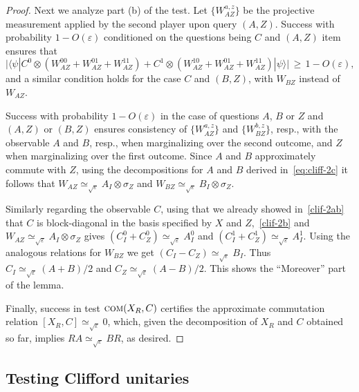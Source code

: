 \documentclass[11pt]{article}
\numberwithin{equation}{section}
\theoremstyle{definition}
\theoremstyle{plain}
\newcommand{\ket}[1]{|#1\rangle}
\newcommand{\bra}[1]{\langle#1|}
\newcommand{\eps}{\varepsilon}
\newcommand{\comt}{\textsc{com}}
\begin{document}
\begin{proof}
Next we analyze part (b) of the test. Let $\{W_{AZ}^{a,z}\}$ be the projective measurement applied by the second player upon query $(A,Z)$. Success with probability $1-O(\eps)$ conditioned on the questions being $C$ and $(A,Z)$ item ensures that 
\begin{equation}\label{clif-2b}
\big| \bra{\psi} C^0 \otimes (W_{AZ}^{00} + W_{AZ}^{01} + W_{AZ}^{11}) + C^1\otimes (W_{AZ}^{10} + W_{AZ}^{01} + W_{AZ}^{11}) \ket{\psi} \big| \,\geq\,1-O(\eps),
\end{equation}
and a similar condition holds for the case $C$ and $(B,Z)$, with $W_{BZ}$ instead of $W_{AZ}$. 

Success with probability $1-O(\eps)$ in the case of questions $A$, $B$ or $Z$ and $(A,Z)$ or $(B,Z)$ %
ensures consistency of $\{W_{AZ}^{a,z}\}$
%
and $\{W_{BZ}^{b,z}\}$, resp., %
with the observable $A$ %
and $B$, resp., 
when marginalizing over the second outcome, 
and $Z$ when marginalizing over the first outcome.  Since
%
%
$A$ and $B$   %
approximately commute
with $Z$,  %
using the decompositions for $A$ and $B$ derived in~\eqref{eq:cliff-2c} it follows that $W_{AZ} \simeq_{\sqrt{\eps}} A_I \otimes \sigma_Z$ and $W_{BZ} \simeq_{\sqrt{\eps}} B_I \otimes \sigma_Z$. 

Similarly regarding the observable $C$, using that we already showed in~\eqref{clif-2ab} that $C$ is block-diagonal in the basis specified by $X$ and $Z$,~\eqref{clif-2b} and $W_{AZ} \simeq_{\sqrt{\eps}} A_I \otimes \sigma_Z$ gives $(C_I^0 + C_Z^0) \simeq_{\sqrt{\eps}} A_I^0$ and $(C_I^1 + C_Z^1) \simeq_{\sqrt{\eps}} A_I^1$. Using the analogous relations for $W_{BZ}$ we get $(C_I - C_Z) \simeq_{\sqrt{\eps}} B_I$. Thus $C_I \simeq_{\sqrt{\eps}} (A+B)/2$ and $C_Z \simeq_{\sqrt{\eps}} (A-B)/2$. This shows the ``Moreover'' part of the lemma. 

Finally, success in test $\comt(X_R,C)$ certifies the approximate commutation relation $[X_R,C]\simeq_{\sqrt{\eps}} 0$, which, given the decomposition of $X_R$ and $C$ obtained so far, implies $RA \simeq_{\sqrt{\eps}} B R$, as desired. 
\end{proof}



\subsection{Testing Clifford unitaries}
\label{sec:n-clifford}
\end{document}
